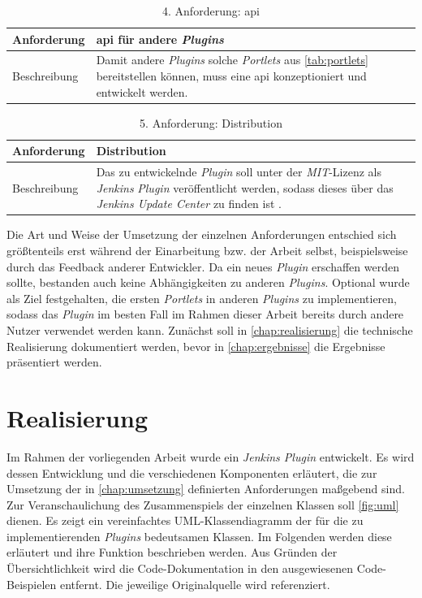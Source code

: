 \begin{table}[H]
\begin{tabularx}{\textwidth} { 
  | X | X | }
 \hline
 Anforderung & \ac{api} für andere \textit{Plugins} \\
 \hline
Beschreibung  & Damit andere \textit{Plugins} solche \textit{Portlets} aus \autoref{tab:portlets} bereitstellen können, muss eine \ac{api} konzeptioniert und entwickelt werden. \\
\hline
\end{tabularx}
\caption{4. Anforderung: \ac{api}}
\end{table}

\begin{table}[H]
\begin{tabularx}{\textwidth} { 
  | X | X | }
 \hline
 Anforderung & Distribution \\
 \hline
Beschreibung  & Das zu entwickelnde \textit{Plugin} soll unter der \textit{MIT}-Lizenz als \textit{Jenkins} \textit{Plugin} veröffentlicht werden, sodass dieses über das \textit{Jenkins Update Center} zu finden ist \citep{jenkinsci_plugin_center}. \\ \hline
\end{tabularx}
\caption{5. Anforderung: Distribution}
\end{table}

Die Art und Weise der Umsetzung der einzelnen Anforderungen entschied sich größtenteils erst während der Einarbeitung bzw. der Arbeit selbst, beispielsweise durch das Feedback anderer Entwickler. Da ein neues \textit{Plugin} erschaffen werden sollte, bestanden auch keine Abhängigkeiten zu anderen \textit{Plugins}. Optional wurde als Ziel festgehalten, die ersten \textit{Portlets} in anderen \textit{Plugins} zu implementieren, sodass das \textit{Plugin} im besten Fall im Rahmen dieser Arbeit bereits durch andere Nutzer verwendet werden kann. Zunächst soll in \autoref{chap:realisierung} die technische Realisierung dokumentiert werden, bevor in \autoref{chap:ergebnisse} die Ergebnisse präsentiert werden.

\section{Realisierung}
\label{chap:realisierung}
Im Rahmen der vorliegenden Arbeit wurde ein \textit{Jenkins Plugin} entwickelt. Es wird dessen Entwicklung und die verschiedenen Komponenten erläutert, die zur Umsetzung der in \autoref{chap:umsetzung} definierten Anforderungen maßgebend sind. Zur Veranschaulichung des Zusammenspiels der einzelnen Klassen soll \autoref{fig:uml} dienen. Es zeigt ein vereinfachtes UML-Klassendiagramm der für die zu implementierenden \textit{Plugins} bedeutsamen Klassen. Im Folgenden werden diese erläutert und ihre Funktion beschrieben werden. Aus Gründen der Übersichtlichkeit wird die Code-Dokumentation in den ausgewiesenen Code-Beispielen entfernt. Die jeweilige Originalquelle wird referenziert.

